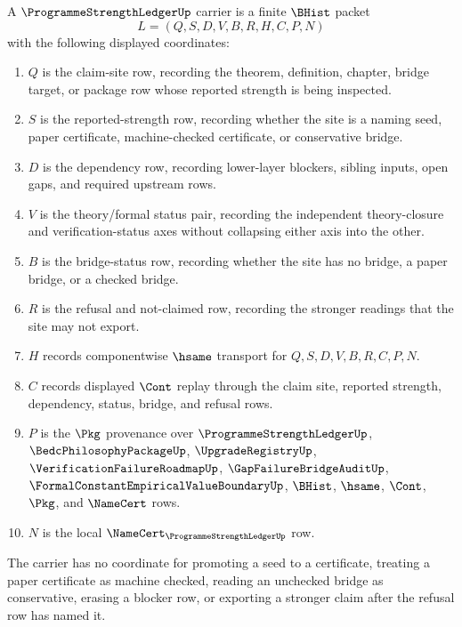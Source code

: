\begin{definition}
\label{def:programme-strength-ledger-carrier}
A $\ProgrammeStrengthLedgerUp$ carrier is a finite $\BHist$ packet
$$
L=(Q,S,D,V,B,R,H,C,P,N)
$$
with the following displayed coordinates:
\begin{enumerate}
\item $Q$ is the claim-site row, recording the theorem, definition, chapter, bridge target, or package row whose reported strength is being inspected.
\item $S$ is the reported-strength row, recording whether the site is a naming seed, paper certificate, machine-checked certificate, or conservative bridge.
\item $D$ is the dependency row, recording lower-layer blockers, sibling inputs, open gaps, and required upstream rows.
\item $V$ is the theory/formal status pair, recording the independent theory-closure and verification-status axes without collapsing either axis into the other.
\item $B$ is the bridge-status row, recording whether the site has no bridge, a paper bridge, or a checked bridge.
\item $R$ is the refusal and not-claimed row, recording the stronger readings that the site may not export.
\item $H$ records componentwise $\hsame$ transport for $Q,S,D,V,B,R,C,P,N$.
\item $C$ records displayed $\Cont$ replay through the claim site, reported strength, dependency, status, bridge, and refusal rows.
\item $P$ is the $\Pkg$ provenance over $\ProgrammeStrengthLedgerUp$, $\BedcPhilosophyPackageUp$, $\UpgradeRegistryUp$, $\VerificationFailureRoadmapUp$, $\GapFailureBridgeAuditUp$, $\FormalConstantEmpiricalValueBoundaryUp$, $\BHist$, $\hsame$, $\Cont$, $\Pkg$, and $\NameCert$ rows.
\item $N$ is the local $\NameCert_{\ProgrammeStrengthLedgerUp}$ row.
\end{enumerate}
The carrier has no coordinate for promoting a seed to a certificate, treating a paper certificate as machine checked, reading an unchecked bridge as conservative, erasing a blocker row, or exporting a stronger claim after the refusal row has named it.
\end{definition}

